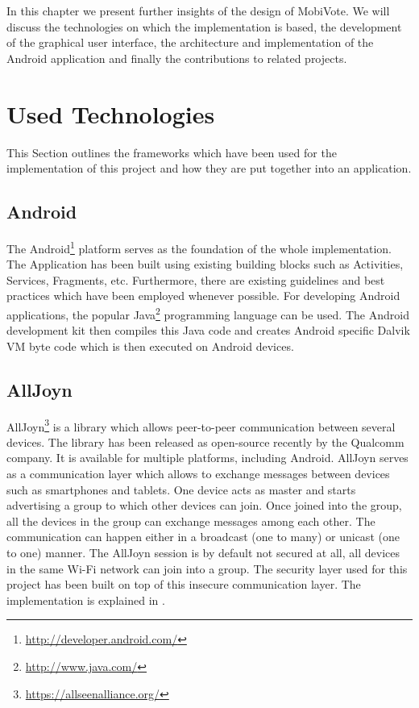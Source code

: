 \documentclass[numbers=noenddot, abstract=on, a4paper, headsepline,
footsepline, oneside, openright, draft=off, listof=leveldown]{scrreprt}
\begin{document}
In this chapter we present further insights of the design of MobiVote. We will
discuss the technologies on which the implementation is based, the development
of the graphical user interface, the architecture and implementation of the
Android application and finally the contributions to related projects.

\section{Used Technologies}
\label{sec:usedtechnologies}
This Section outlines the frameworks which have been used for the implementation
of this project and how they are put together into an application.
\subsection{Android}
\label{sec:android}
The Android\footnote{\url{http://developer.android.com/}} platform serves as the
foundation of the whole implementation. The Application has been built using
existing building blocks such as Activities, Services, Fragments, etc.
Furthermore, there are existing guidelines and best practices which have been
employed whenever possible. For developing Android applications, the popular
Java\footnote{\url{http://www.java.com/}} programming language can be used. The
Android development kit then compiles this Java code and creates Android
specific Dalvik VM byte code which is then executed on Android devices.

\subsection{AllJoyn}
\label{sec:alljoyn}
AllJoyn\footnote{\url{https://allseenalliance.org/}} is a library which allows
peer-to-peer communication between several devices. The library has been
released as open-source recently by the Qualcomm company. It is available for
multiple platforms, including Android. AllJoyn serves as a communication layer
which allows to exchange messages between devices such as smartphones and
tablets. One device acts as master and starts advertising a group to which other
devices can join. Once joined into the group, all the devices in the group can
exchange messages among each other. The communication can happen either in a
broadcast (one to many) or unicast (one to one) manner. The AllJoyn session is
by default not secured at all, all devices in the same Wi-Fi network can join
into a group. The security layer used for this project has been built on top of
this insecure communication layer. The implementation is explained
in .
\end{document}
